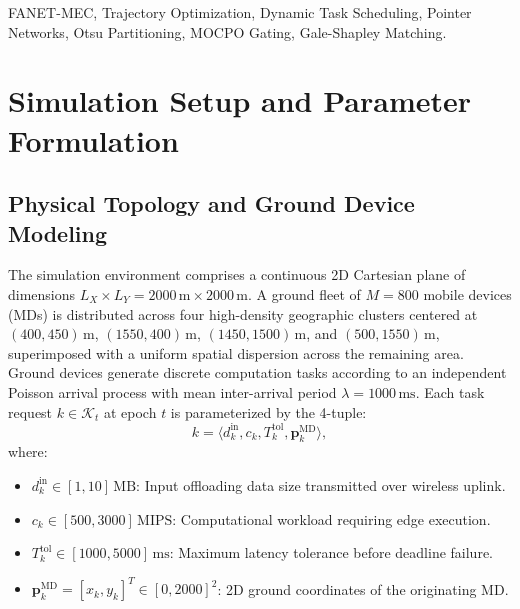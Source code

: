 \documentclass[journal]{IEEEtran}
\begin{document}
\begin{abstract}
\textbf{Implications:} These findings establish that spatial trajectory geometry dictates network capacity bounds while matching maintenance algorithms dictate runtime control-loop feasibility, providing foundational architectural guidelines for resilient aerial edge computing swarms.
\end{abstract}

\begin{IEEEkeywords}
FANET-MEC, Trajectory Optimization, Dynamic Task Scheduling, Pointer Networks, Otsu Partitioning, MOCPO Gating, Gale-Shapley Matching.
\end{IEEEkeywords}

\IEEEpeerreviewmaketitle

\section{Simulation Setup and Parameter Formulation}

\subsection{Physical Topology and Ground Device Modeling}
The simulation environment comprises a continuous 2D Cartesian plane of dimensions $L_X \times L_Y = 2000\,\text{m} \times 2000\,\text{m}$. A ground fleet of $M = 800$ mobile devices (MDs) is distributed across four high-density geographic clusters centered at $(400, 450)\,\text{m}$, $(1550, 400)\,\text{m}$, $(1450, 1500)\,\text{m}$, and $(500, 1550)\,\text{m}$, superimposed with a uniform spatial dispersion across the remaining area. Ground devices generate discrete computation tasks according to an independent Poisson arrival process with mean inter-arrival period $\lambda = 1000\,\text{ms}$. Each task request $k \in \mathcal{K}_t$ at epoch $t$ is parameterized by the 4-tuple:
\begin{equation}
    k = \langle d_k^{\text{in}}, c_k, T_k^{\text{tol}}, \mathbf{p}_k^{\text{MD}} \rangle,
\end{equation}
where:
\begin{itemize}
    \item $d_k^{\text{in}} \in [1, 10]\,\text{MB}$: Input offloading data size transmitted over wireless uplink.
    \item $c_k \in [500, 3000]\,\text{MIPS}$: Computational workload requiring edge execution.
    \item $T_k^{\text{tol}} \in [1000, 5000]\,\text{ms}$: Maximum latency tolerance before deadline failure.
    \item $\mathbf{p}_k^{\text{MD}} = [x_k, y_k]^T \in [0, 2000]^2$: 2D ground coordinates of the originating MD.
\end{itemize}
\end{document}
